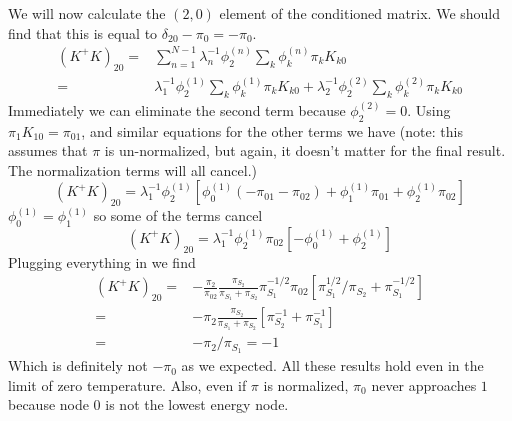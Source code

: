 \documentclass[a4paper]{article}
\begin{document}
We will now calculate the $(2,0)$ element of the conditioned matrix.  We should find that this
is equal to $\delta_{20} - \pi_0 = -\pi_0$.
\begin{align}
  \left(K^+ K \right)_{20} = & \sum_{n=1}^{N-1} \lambda_n^{-1} \phi_2^{(n)} \sum_k \phi_k^{(n)} \pi_k K_{k0} \\
= & \lambda_1^{-1} \phi_2^{(1)} \sum_k \phi_k^{(1)} \pi_k K_{k0}
+ \lambda_2^{-1} \phi_2^{(2)} \sum_k \phi_k^{(2)} \pi_k K_{k0}
\end{align}
Immediately we can eliminate the second term because $\phi_2^{(2)} = 0$.
Using $\pi_{1} K_{10} = \pi_{01}$, and similar equations for the other terms we have (note: this 
assumes that $\pi$ is un-normalized, but again, it doesn't matter for the final result.  The normalization 
terms will all cancel.)
\begin{equation}
\left(K^+ K \right)_{20} =  \lambda_1^{-1} \phi_2^{(1)} \left[ 
\phi_0^{(1)} \left( - \pi_{01} - \pi_{02} \right)
+ \phi_1^{(1)} \pi_{01} 
+ \phi_2^{(1)} \pi_{02} 
\right]
\end{equation}
$\phi_0^{(1)} = \phi_1^{(1)}$ so some of the terms cancel
\begin{equation}
\left(K^+ K \right)_{20} =  \lambda_1^{-1} \phi_2^{(1)}  \pi_{02} \left[ 
-\phi_0^{(1)}
+ \phi_2^{(1)}
\right]
\end{equation}
Plugging everything in we find
\begin{align}
\left(K^+ K \right)_{20} = & -\frac{\pi_2}{\pi_{02}} \frac{\pi_{S_2}}{\pi_{S_1} + \pi_{S_2}}  \pi_{S_1}^{-1/2} \pi_{02} \left[ 
\pi_{S_1}^{1/2} / \pi_{S_2}
+ \pi_{S_1}^{-1/2}
\right] \\
= & -\pi_2 \frac{\pi_{S_2}}{\pi_{S_1} + \pi_{S_2}} \left[ 
\pi_{S_2}^{-1}
+ \pi_{S_1}^{-1}
\right] \\
= & -\pi_2 /
\pi_{S_1} = -1
\end{align}
Which is definitely not $-\pi_0$ as we expected.  All these results hold even in the limit of zero temperature.  
Also, even if $\pi$ is normalized, $\pi_0$ never approaches $1$ because node 0 is not the lowest energy node.
\end{document}
